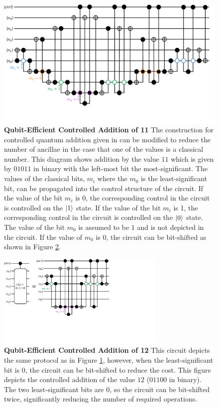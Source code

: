 \begin{figure}
    \centering
    \includegraphics[width=12cm]{figures/ctrl-add-11-qubit-efficient.pdf}
    \caption{
        \textbf{Qubit-Efficient Controlled Addition of 11}
        The construction for controlled quantum addition given in \cite{gidney2018halving} can be modified to reduce the number of ancillae in the case that one of the values is a classical number.
        This diagram shows addition by the value $11$ which is given by $01011$ in binary with the left-most bit the most-significant.
        The values of the classical bits, $m_i$ where the $m_0$ is the least-significant bit, can be propagated into the control structure of the circuit.
        If the value of the bit $m_i$ is 0, the corresponding control in the circuit is controlled on the $\ket{1}$ state.
        If the value of the bit $m_i$ is 1, the corresponding control in the circuit is controlled on the $\ket{0}$ state.
        The value of the bit $m_0$ is assumed to be $1$ and is not depicted in the circuit.
        If the value of $m_0$ is $0$, the circuit can be bit-shifted as shown in Figure \ref{fig:addition-qubit-efficient-12}.
    }
    \label{fig:addition-qubit-efficient-11}
\end{figure}

\begin{figure}
    \centering
    \includegraphics[width=8cm]{figures/ctrl-add-12-qubit-efficient.pdf}
    \caption{
        \textbf{Qubit-Efficient Controlled Addition of 12} 
        This circuit depicts the same protocol as in Figure \ref{fig:addition-qubit-efficient-11}, however, when the least-significant bit is $0$, the circuit can be bit-shifted to reduce the cost.
        This figure depicts the controlled addition of the value $12$ ($01100$ in binary).
        The two least-significant bits are $0$, so the circuit can be bit-shifted twice, significantly reducing the number of required operations.
    }
    \label{fig:addition-qubit-efficient-12}
\end{figure}

